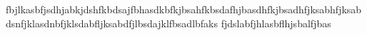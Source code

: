 fbjlkasbfjsdhjabkjdshfkbdsajfbhasdkbfkjbsahfkbsdafhjbasdhfkjbsadhfjksabhfjksab
dsnfjklasdnbfjklsdabfljksabdfjlbsdajklfbsadlbfaks
fjdslabfjhlasbflhjsbalfjbas